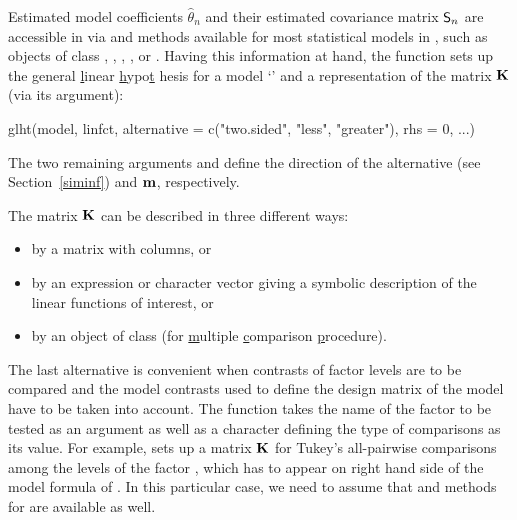 \documentclass[bimj,fleqn]{w-art}
\begin{document}
Estimated model coefficients $\hat{\theta}_n$ and their estimated covariance matrix $%
\Sraw$ are accessible in \RR{} via  and 
methods available for most statistical models in \RR, such as objects of
class , , , ,  or %
. Having this information at hand, the  function sets
up the \underline{g}eneral \underline{l}inear \underline{h}ypo\underline{t}%
hesis for a model `' and a representation of the matrix $\mathbf{K}$
(via its  argument): 
\begin{Sinput}
glht(model, linfct, alternative = c("two.sided", "less", "greater"),
     rhs = 0, ...)
\end{Sinput}
The two remaining arguments  and  define the
direction of the alternative (see Section~\ref{siminf}) and $\mathbf{m}$,
respectively.

The matrix $\mathbf{K}$ can be described in three different ways:

\begin{itemize}
\item by a matrix with  columns, or

\item by an expression or character vector giving a symbolic description  of
the linear functions of interest, or

\item by an object of class   (for \underline{m}ultiple 
\underline{c}omparison \underline{p}rocedure).
\end{itemize}

The last alternative is convenient when contrasts of factor levels are to be
compared and the model contrasts used to define the design matrix of the
model have to be taken into account. The  function takes the
name of the factor to be tested as an argument as well as a character
defining the type of comparisons as its value. For example,  sets up a matrix $\mathbf{K}$ for Tukey's all-pairwise comparisons among
the levels of the factor , which has to appear on right hand
side of the model formula of . In this particular case, we
need to assume that  and  methods
for  are available as well.
\end{document}
